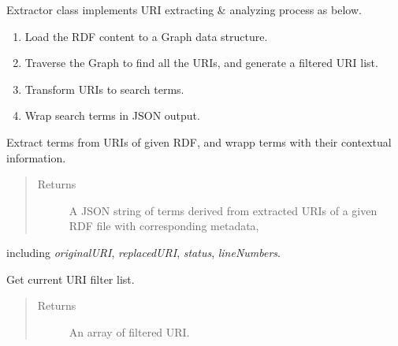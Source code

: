 \documentclass[letterpaper,10pt,english]{sphinxmanual}
\begin{document}
\begin{fulllineitems}
\label{docs/api:Extractor}
Extractor class implements
URI extracting \& analyzing process as below.
\begin{enumerate}
\item {} 
Load the RDF content to a Graph data structure.

\item {} 
Traverse the Graph to find all the URIs, and generate a filtered URI list.

\item {} 
Transform URIs to search terms.

\item {} 
Wrap search terms in JSON output.

\end{enumerate}

\begin{fulllineitems}
\label{docs/api:Extractor::getQueryTerms}
Extract terms from URIs of given RDF, and wrapp terms
with their contextual information.
\begin{quote}\begin{description}
\item[{Returns}] \leavevmode
A JSON string of terms derived from extracted URIs of a given RDF file with corresponding metadata,

\end{description}\end{quote}

including \emph{originalURI}, \emph{replacedURI}, \emph{status}, \emph{lineNumbers}.

\end{fulllineitems}


\begin{fulllineitems}
\label{docs/api:Extractor::getFiltedUris}
Get current URI filter list.
\begin{quote}\begin{description}
\item[{Returns}] \leavevmode
An array of filtered URI.

\end{description}\end{quote}


\end{fulllineitems}
\end{fulllineitems}
\end{document}

